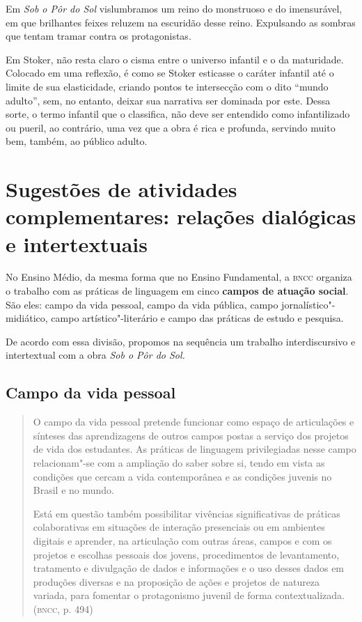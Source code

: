 \documentclass[12pt]{extarticle}
\begin{document}
Em \emph{Sob o Pôr do Sol} vislumbramos um reino do monstruoso e do
imensurável, em que brilhantes feixes reluzem na escuridão desse reino.
Expulsando as sombras que tentam tramar contra os protagonistas.

Em Stoker, não resta claro o cisma entre o universo infantil e o da
maturidade. Colocado em uma reflexão, é como se Stoker esticasse o
caráter infantil até o limite de sua elasticidade, criando pontos te
intersecção com o dito ``mundo adulto'', sem, no entanto, deixar sua
narrativa ser dominada por este. Dessa sorte, o termo infantil que o
classifica, não deve ser entendido como infantilizado ou pueril, ao
contrário, uma vez que a obra é rica e profunda, servindo muito bem,
também, ao público adulto.

\section{Sugestões de atividades complementares: relações dialógicas e
intertextuais}


No Ensino Médio, da mesma forma que no Ensino Fundamental, a \textsc{bncc}
organiza o trabalho com as práticas de linguagem em cinco \textbf{campos
de atuação social}. São eles: campo da vida pessoal, campo da vida
pública, campo jornalístico"-midiático, campo artístico"-literário e campo
das práticas de estudo e pesquisa.

De acordo com essa divisão, propomos na sequência um trabalho
interdiscursivo e intertextual com a obra \emph{Sob o Pôr do Sol.}

\subsection{Campo da vida pessoal}

\begin{quote}
O campo da vida pessoal pretende funcionar como espaço de articulações
e sínteses das aprendizagens de outros campos postas a serviço dos
projetos de vida dos estudantes. As práticas de linguagem privilegiadas
nesse campo relacionam"-se com a ampliação do saber sobre si, tendo em
vista as condições que cercam a vida contemporânea e as condições
juvenis no Brasil e no mundo.

Está em questão também possibilitar vivências significativas de práticas
colaborativas em situações de interação presenciais ou em ambientes
digitais e aprender, na articulação com outras áreas, campos e com os
projetos e escolhas pessoais dos jovens, procedimentos de levantamento,
tratamento e divulgação de dados e informações e o uso desses dados em
produções diversas e na proposição de ações e projetos de natureza
variada, para fomentar o protagonismo juvenil de forma
contextualizada. (\textsc{bncc}, p. 494)
\end{quote}
\end{document}
